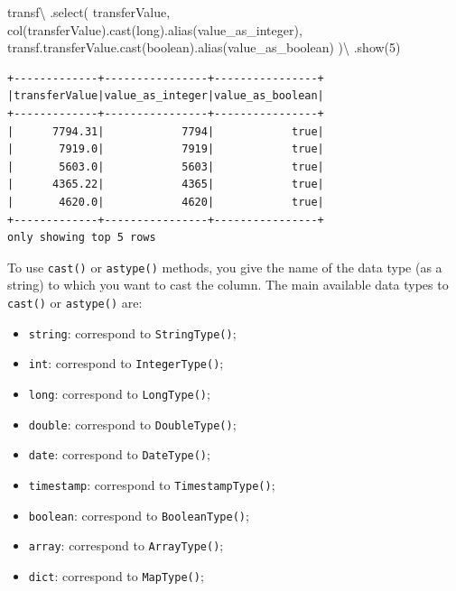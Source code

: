 \documentclass[
  11pt,
  letterpaper,
  DIV=11,
  numbers=noendperiod]{scrreprt}
\newenvironment{Shaded}{\begin{snugshade}}{\end{snugshade}}
\newcommand{\DecValTok}[1]{\textcolor[rgb]{0.68,0.00,0.00}{#1}}
\newcommand{\NormalTok}[1]{\textcolor[rgb]{0.00,0.23,0.31}{#1}}
\newcommand{\OperatorTok}[1]{\textcolor[rgb]{0.37,0.37,0.37}{#1}}
\newcommand{\StringTok}[1]{\textcolor[rgb]{0.13,0.47,0.30}{#1}}
\providecommand{\tightlist}{%
  \setlength{\itemsep}{0pt}\setlength{\parskip}{0pt}}\usepackage{longtable,booktabs,array}
\begin{document}
\begin{Shaded}
\begin{Highlighting}[]
\NormalTok{transf}\OperatorTok{\textbackslash{}}
\NormalTok{  .select(}
    \StringTok{\textquotesingle{}transferValue\textquotesingle{}}\NormalTok{,}
\NormalTok{    col(}\StringTok{\textquotesingle{}transferValue\textquotesingle{}}\NormalTok{).cast(}\StringTok{\textquotesingle{}long\textquotesingle{}}\NormalTok{).alias(}\StringTok{\textquotesingle{}value\_as\_integer\textquotesingle{}}\NormalTok{),}
\NormalTok{    transf.transferValue.cast(}\StringTok{\textquotesingle{}boolean\textquotesingle{}}\NormalTok{).alias(}\StringTok{\textquotesingle{}value\_as\_boolean\textquotesingle{}}\NormalTok{)}
\NormalTok{  )}\OperatorTok{\textbackslash{}}
\NormalTok{  .show(}\DecValTok{5}\NormalTok{)}
\end{Highlighting}
\end{Shaded}

\begin{verbatim}
+-------------+----------------+----------------+
|transferValue|value_as_integer|value_as_boolean|
+-------------+----------------+----------------+
|      7794.31|            7794|            true|
|       7919.0|            7919|            true|
|       5603.0|            5603|            true|
|      4365.22|            4365|            true|
|       4620.0|            4620|            true|
+-------------+----------------+----------------+
only showing top 5 rows
\end{verbatim}

To use \texttt{cast()} or \texttt{astype()} methods, you give the name
of the data type (as a string) to which you want to cast the column. The
main available data types to \texttt{cast()} or \texttt{astype()} are:

\begin{itemize}
\tightlist
\item
  \texttt{\textquotesingle{}string\textquotesingle{}}: correspond to
  \texttt{StringType()};
\item
  \texttt{\textquotesingle{}int\textquotesingle{}}: correspond to
  \texttt{IntegerType()};
\item
  \texttt{\textquotesingle{}long\textquotesingle{}}: correspond to
  \texttt{LongType()};
\item
  \texttt{\textquotesingle{}double\textquotesingle{}}: correspond to
  \texttt{DoubleType()};
\item
  \texttt{\textquotesingle{}date\textquotesingle{}}: correspond to
  \texttt{DateType()};
\item
  \texttt{\textquotesingle{}timestamp\textquotesingle{}}: correspond to
  \texttt{TimestampType()};
\item
  \texttt{\textquotesingle{}boolean\textquotesingle{}}: correspond to
  \texttt{BooleanType()};
\item
  \texttt{\textquotesingle{}array\textquotesingle{}}: correspond to
  \texttt{ArrayType()};
\item
  \texttt{\textquotesingle{}dict\textquotesingle{}}: correspond to
  \texttt{MapType()};
\end{itemize}
\end{document}
